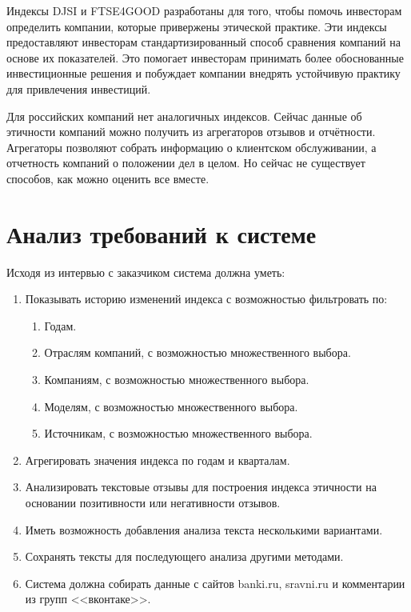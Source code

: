 \documentclass[PI, VKR]{HSEUniversity}
\begin{document}
Индексы DJSI и FTSE4GOOD разработаны для того, чтобы помочь инвесторам определить компании, которые привержены этической практике. Эти индексы предоставляют инвесторам стандартизированный способ сравнения компаний на основе их показателей. Это помогает инвесторам принимать более обоснованные инвестиционные решения и побуждает компании внедрять устойчивую практику для привлечения инвестиций.

Для российских компаний нет аналогичных индексов. Сейчас данные об этичности компаний можно получить из агрегаторов отзывов и отчётности. Агрегаторы позволяют собрать информацию о клиентском обслуживании, а отчетность компаний о положении дел в целом. Но сейчас не существует способов, как можно оценить все вместе.
\section{Анализ требований к системе}
\label{sec:orgbadbe34}
Исходя из интервью с заказчиком система должна уметь:

\begin{enumerate}
\item Показывать историю изменений индекса с возможностью фильтровать по:
\begin{enumerate}
\item Годам.
\item Отраслям компаний, с возможностью множественного выбора.
\item Компаниям, с возможностью множественного выбора.
\item Моделям, с возможностью множественного выбора.
\item Источникам, с возможностью множественного выбора.
\end{enumerate}
\item Агрегировать значения индекса по годам и кварталам.
\item Анализировать текстовые отзывы для построения индекса этичности на основании позитивности или негативности отзывов.
\item Иметь возможность добавления анализа текста несколькими вариантами.
\item Сохранять тексты для последующего анализа другими методами.
\item Система должна собирать данные с сайтов banki.ru, sravni.ru и комментарии из групп {}<<вконтаке>>{}.
\end{enumerate}
\end{document}
